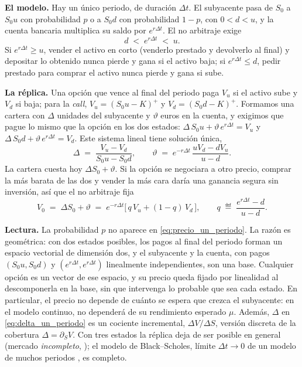 \noindent\textbf{El modelo.}
Hay un único periodo, de duración $\Delta t$. El subyacente pasa de
$S_0$ a $S_0 u$ con probabilidad $p$ o a $S_0 d$ con probabilidad
$1 - p$, con $0 < d < u$, y la cuenta bancaria multiplica su saldo por
$e^{r\Delta t}$. El no arbitraje exige
\begin{equation}\label{eq:no_arbitraje_un_periodo}
  d \;<\; e^{r\Delta t} \;<\; u .
\end{equation}
Si $e^{r\Delta t} \geq u$, vender el activo en corto (venderlo prestado
y devolverlo al final) y depositar lo obtenido nunca pierde y gana si el
activo baja; si $e^{r\Delta t} \leq d$, pedir prestado para comprar el
activo nunca pierde y gana si sube.

\medskip

\noindent\textbf{La réplica.}
Una opción que vence al final del periodo paga $V_u$ si el activo sube
y $V_d$ si baja; para la \emph{call}, $V_u = (S_0 u - K)^+$ y
$V_d = (S_0 d - K)^+$. Formamos una cartera con $\Delta$ unidades del
subyacente y $\vartheta$ euros en la cuenta, y exigimos que pague lo mismo
que la opción en los dos estados:
$\Delta\, S_0 u + \vartheta\, e^{r\Delta t} = V_u$ y
$\Delta\, S_0 d + \vartheta\, e^{r\Delta t} = V_d$. Este sistema lineal
tiene solución única,
\begin{equation}\label{eq:delta_un_periodo}
  \Delta \;=\; \frac{V_u - V_d}{S_0 u - S_0 d},
  \qquad
  \vartheta \;=\; e^{-r\Delta t}\,\frac{u V_d - d V_u}{u - d}.
\end{equation}
La cartera cuesta hoy $\Delta S_0 + \vartheta$. Si la opción se negociara a
otro precio, comprar la más barata de las dos y vender la más cara daría
una ganancia segura sin inversión, así que el no arbitraje fija
\begin{equation}\label{eq:precio_un_periodo}
  V_0 \;=\; \Delta S_0 + \vartheta
  \;=\; e^{-r\Delta t}\bigl[\,q\, V_u + (1 - q)\, V_d\,\bigr],
  \qquad
  q \;\eqdef\; \frac{e^{r\Delta t} - d}{u - d}.
\end{equation}

\noindent\textbf{Lectura.}
La probabilidad $p$ no aparece en \eqref{eq:precio_un_periodo}. La razón
es geométrica: con dos estados posibles, los pagos al final del periodo
forman un espacio vectorial de dimensión dos, y el subyacente y la
cuenta, con pagos $(S_0 u, S_0 d)$ y $(e^{r\Delta t}, e^{r\Delta t})$
linealmente independientes, son una base. Cualquier opción es un vector
de ese espacio, y su precio queda fijado por linealidad al descomponerla
en la base, sin que intervenga lo probable que sea cada estado. En
particular, el precio no depende de cuánto se espera que crezca el
subyacente: en el modelo continuo, no dependerá de su rendimiento
esperado $\mu$. Además, $\Delta$ en \eqref{eq:delta_un_periodo} es un
cociente incremental, $\Delta V / \Delta S$, versión discreta de la
cobertura $\Delta = \partial_S V$.
Con tres estados la réplica deja de ser posible en general (mercado
\emph{incompleto}, \cite[sec.~2.2.5]{tfgm}); el modelo de
Black--Scholes, límite $\Delta t \to 0$ de un modelo de muchos periodos
\cite[secs.~2.3--2.4]{tfgm}, es completo.


